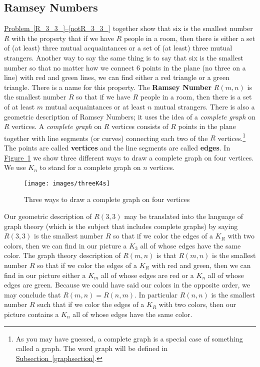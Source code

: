 \documentclass[10pt,]{book}
\newcommand{\terminology}[1]{\textbf{#1}}
\theoremstyle{plain}
\theoremstyle{definition}
\theoremstyle{definition}
\numberwithin{equation}{chapter}
\begin{document}
\subsection[{Ramsey Numbers}]{Ramsey Numbers}\label{Ramseysection}
\hyperref[R_3_3_]{Problem~\ref{R_3_3_}--\ref{notR_3_3_}} together show that six is the smallest number \(R\) with the property that if we have \(R\) people in a room, then there is either a set of (at least) three mutual acquaintances or a set of (at least) three mutual strangers. Another way to say the same thing is to say that six is the smallest number so that no matter how we connect 6 points in the plane (no three on a line) with red and green lines, we can find either a red triangle or a green triangle. There is a name for this property. The \terminology{Ramsey Number} \(R(m,n)\) is the smallest number \(R\) so that if we have \(R\) people in a room, then there is a set of at least \(m\) mutual acquaintances or at least \(n\) mutual strangers. There is also a geometric description of Ramsey Numbers; it uses the idea of a \emph{complete graph} on \(R\) vertices. A \emph{complete graph} on \(R\) vertices consists of \(R\) points in the plane together with line segments (or curves) connecting each two of the \(R\) vertices.\footnote{As you may have guessed, a complete graph is a special case of something called a graph.  The word graph will be defined in \hyperref[graphsection]{Subsection~\ref{graphsection}}.\label{fn-4}} The points are called \terminology{vertices} and the line segments are called \terminology{edges}. In \hyperref[completegraph]{Figure~\ref{completegraph}} we show three different ways to draw a complete graph on four vertices. We use \(K_n\) to stand for a complete graph on \(n\) vertices.%
\begin{figure}
\centering
\texttt{[image: images/threeK4s]}
\caption{Three ways to draw a complete graph on four vertices\label{completegraph}}
\end{figure}
Our geometric description of \(R(3,3)\) may be translated into the language of graph theory (which is the subject that includes complete graphs) by saying \(R(3,3)\) is the smallest number \(R\) so that if we color the edges of a \(K_R\) with two colors, then we can find in our picture a \(K_3\) all of whose edges have the same color.  The graph theory description of \(R(m,n)\) is that \(R(m,n)\) is the smallest number \(R\) so that if we color the edges of a \(K_R\) with red and green, then we can find in our picture either a \(K_m\) all of whose edges are red or a \(K_n\) all of whose edges are green. Because we could have said our colors in the opposite order, we may conclude that \(R(m,n) = R(n,m)\). In particular \(R(n,n)\) is the smallest number \(R\) such that if we color the edges of a \(K_R\) with two colors, then our picture contains a \(K_n\) all of whose edges have the same color.%
\end{document}

